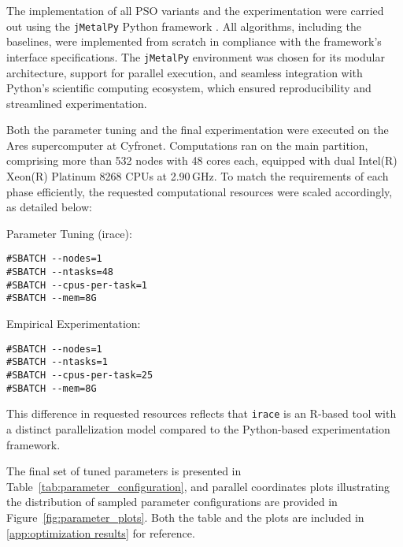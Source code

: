 {The implementation of all PSO variants and the experimentation were carried out using the \texttt{jMetalPy} Python framework \citep{benitezhidalgo2019jmetalpy}. All algorithms, including the baselines, were implemented from scratch in compliance with the framework’s interface specifications. The \texttt{jMetalPy} environment was chosen for its modular architecture, support for parallel execution, and seamless integration with Python’s scientific computing ecosystem, which ensured reproducibility and streamlined experimentation.

Both the parameter tuning and the final experimentation were executed on the Ares supercomputer at Cyfronet. Computations ran on the main partition, comprising more than 532 nodes with 48 cores each, equipped with dual Intel(R) Xeon(R) Platinum 8268 CPUs at 2.90\,GHz. To match the requirements of each phase efficiently, the requested computational resources were scaled accordingly, as detailed below:

\vspace{.835em}
\begin{tcbraster}[
    raster columns=2, 
    raster equal height, 
    nobeforeafter, 
    raster column skip=2cm
]
\begin{blkblock}{Parameter Tuning (irace):}
    \begin{verbatim}#SBATCH --nodes=1
#SBATCH --ntasks=48
#SBATCH --cpus-per-task=1
#SBATCH --mem=8G\end{verbatim}
\end{blkblock}
\begin{blkblock}{Empirical Experimentation:}
    \begin{verbatim}#SBATCH --nodes=1
#SBATCH --ntasks=1
#SBATCH --cpus-per-task=25
#SBATCH --mem=8G\end{verbatim}
\end{blkblock}
\end{tcbraster}
\vspace{.835em}

\noindent This difference in requested resources reflects that \texttt{irace} is an R-based tool with a distinct parallelization model compared to the Python-based experimentation framework.

The final set of tuned parameters is presented in Table~\ref{tab:parameter_configuration}, and parallel coordinates plots illustrating the distribution of sampled parameter configurations are provided in Figure~\ref{fig:parameter_plots}. Both the table and the plots are included in \autoref{app:optimization results} for reference.

}
